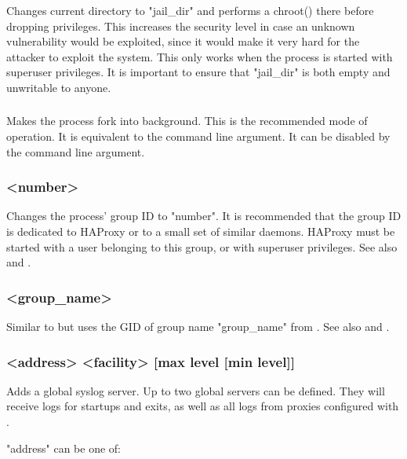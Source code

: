 Changes current directory to "jail\_dir" and performs a chroot() there before
dropping privileges. This increases the security level in case an unknown
vulnerability would be exploited, since it would make it very hard for the
attacker to exploit the system. This only works when the process is started
with superuser privileges. It is important to ensure that "jail\_dir" is both
empty and unwritable to anyone.
  
\subsubsection[daemon]{}

Makes the process fork into background. This is the recommended mode of
operation. It is equivalent to the command line  argument. It can be
disabled by the command line  argument.
  
\subsubsection[gid]{ <number>}

Changes the process' group ID to "number". It is recommended that the group
ID is dedicated to HAProxy or to a small set of similar daemons. HAProxy must
be started with a user belonging to this group, or with superuser privileges.
See also  and .
  
\subsubsection[group]{ <group\_name>}

Similar to  but uses the GID of group name "group\_name" from .
See also  and .

\subsubsection[log]{ <address> <facility> [max level [min level]]}

Adds a global syslog server. Up to two global servers can be defined. They
will receive logs for startups and exits, as well as all logs from proxies
configured with .

"address" can be one of:

